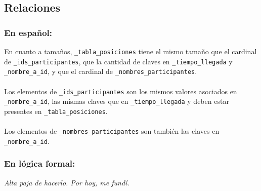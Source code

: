 \documentclass{article}
\begin{document}
        \subsection*{Relaciones}
            \subsubsection*{En español:}
                En cuanto a tamaños, \texttt{\_tabla\_posiciones} tiene el mismo tamaño que el cardinal de \texttt{\_ids\_participantes}, que la cantidad de claves en \texttt{\_tiempo\_llegada} y \texttt{\_nombre\_a\_id}, y que el cardinal de \texttt{\_nombres\_participantes}. \\
                \\
                Los elementos de \texttt{\_ids\_participantes} son los mismos valores asociados en \texttt{\_nombre\_a\_id}, las mismas claves que en \texttt{\_tiempo\_llegada} y deben estar presentes en \texttt{\_tabla\_posiciones}. \\
                \\
                Los elementos de \texttt{\_nombres\_participantes} son también las claves en \texttt{\_nombre\_a\_id}.
            \subsubsection*{En lógica formal:}
                \textit{Alta paja de hacerlo. Por hoy, me fundí.}
\end{document}
